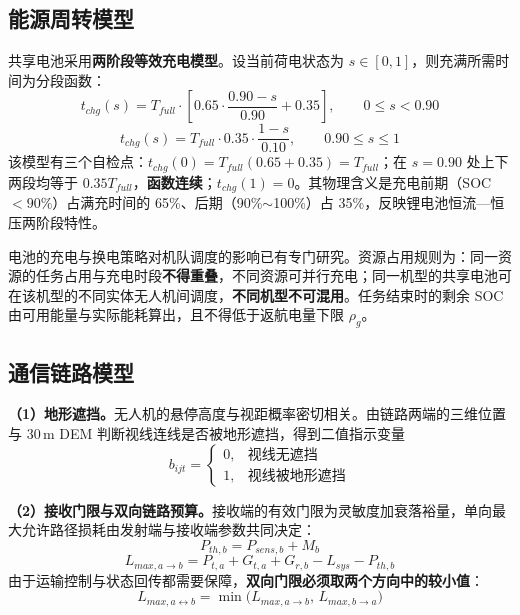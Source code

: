 \subsection{能源周转模型}

共享电池采用\textbf{两阶段等效充电模型}。设当前荷电状态为 $s\in[0,1]$，则充满所需时间为分段函数：
\begin{equation}
	\label{eq:10}
	t_{chg}(s)=T_{full}\cdot\left[0.65\cdot\frac{0.90-s}{0.90}+0.35\right],\qquad 0\le s<0.90
\end{equation}
\begin{equation}
	\label{eq:11}
	t_{chg}(s)=T_{full}\cdot0.35\cdot\frac{1-s}{0.10},\qquad 0.90\le s\le 1
\end{equation}
该模型有三个自检点：$t_{chg}(0)=T_{full}(0.65+0.35)=T_{full}$；在 $s=0.90$ 处上下两段均等于 $0.35T_{full}$，\textbf{函数连续}；$t_{chg}(1)=0$。其物理含义是充电前期（SOC $<90\%$）占满充时间的 65\%、后期（90\%$\sim$100\%）占 35\%，反映锂电池恒流—恒压两阶段特性。

电池的充电与换电策略对机队调度的影响已有专门研究\cite{kim2018batterycharging,mitici2022batteryswap}。资源占用规则为：同一资源的任务占用与充电时段\textbf{不得重叠}，不同资源可并行充电；同一机型的共享电池可在该机型的不同实体无人机间调度，\textbf{不同机型不可混用}。任务结束时的剩余 SOC 由可用能量与实际能耗算出，且不得低于返航电量下限 $\rho_{g}$。

\subsection{通信链路模型}

\textbf{（1）地形遮挡。}无人机的悬停高度与视距概率密切相关\cite{alhourani2014lap}。由链路两端的三维位置与 30\,m DEM 判断视线连线是否被地形遮挡，得到二值指示变量
\begin{equation}
	\label{eq:12}
	b_{ijt}=\begin{cases}0,&\text{视线无遮挡}\\1,&\text{视线被地形遮挡}\end{cases}
\end{equation}

\textbf{（2）接收门限与双向链路预算。}接收端的有效门限为灵敏度加衰落裕量，单向最大允许路径损耗由发射端与接收端参数共同决定：
\begin{equation}
	\label{eq:13}
	P_{th,b}=P_{sens,b}+M_{b}
\end{equation}
\begin{equation}
	\label{eq:14}
	L_{max,a\to b}=P_{t,a}+G_{t,a}+G_{r,b}-L_{sys}-P_{th,b}
\end{equation}
由于运输控制与状态回传都需要保障，\textbf{双向门限必须取两个方向中的较小值}：
\begin{equation}
	\label{eq:15}
	L_{max,a\leftrightarrow b}=\min\big(L_{max,a\to b},\,L_{max,b\to a}\big)
\end{equation}

